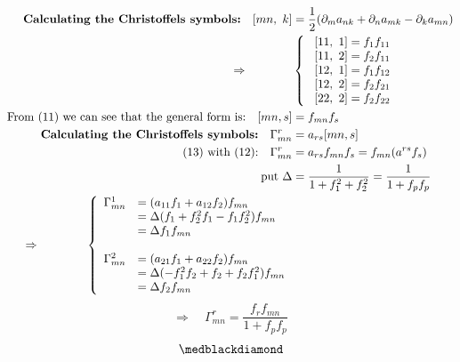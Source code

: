 \begin{align}
\textbf{Calculating the Christoffels symbols:}\quad [mn,\ k] &= \frac{1}{2} (\partial_m a_{nk}+\partial_n a_{mk}-\partial_k a_{mn})\\
\Rightarrow\quad\quad\quad\quad & \left \{ \begin{array}{c}
\ [11,\ 1] =  f_1 f_{11}\\
\ [11,\ 2] =  f_2 f_{11}\\
\ [12,\ 1] =  f_1 f_{12}\\
\ [12,\ 2] =  f_2 f_{21}\\
\ [22,\ 2] =  f_2 f_{22}\\
\end{array}\right.\\
\text{From (11) we can see that the general form is:}\quad [mn,s] &= f_{mn}f_s\\
\textbf{Calculating the Christoffels symbols:}\quad \Gamma^r_{mn} &= a_{rs}[mn,s]\\ 
\text{(13) with (12):}\quad \Gamma^r_{mn} &= a_{rs}f_{mn}f_s = f_{mn}(a^{rs}f_s)\\
\text{put } \Delta &= \frac{1}{1 + f_1 ^2+f_2 ^2}=\frac{1}{1 + f_p f_p} \\
\Rightarrow\quad\quad\quad\quad  \left \{ \begin{array}{ll}
\Gamma^1_{mn} & = (a_{11} f_1 + a_{12} f_2)f_{mn}\\
\ & =  \Delta(f_1  + f_2^2f_1 - f_1f_2^2)f_{mn}\\
\ & =  \Delta f_1 f_{mn}\\\\
\Gamma^2_{mn} & = (a_{21} f_1 + a_{22} f_2)f_{mn}\\
\ & =  \Delta(- f_1^2f_2+f_2   + f_2f_1^2)f_{mn}\\
\ & =  \Delta f_2 f_{mn}\\
\end{array}\right. & 
\end{align}
$$\Rightarrow\quad \Gamma^r_{mn} = \frac{f_r f_{mn}}{1 + f_p f_p}$$
$$\medblackdiamond$$
\newpage

